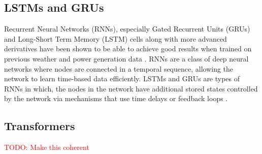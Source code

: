 \subsection{LSTMs and GRUs\label{cha:RNN}}
Recurrent Neural Networks (RNNs), especially Gated Recurrent Units (GRUs) and Long-Short Term Memory (LSTM) cells \cite{Goodfellow-et-al-2016} along with more advanced derivatives have been shown to be able to achieve good results when trained on previous weather and power generation data \cite{lin_temporal_2020, lee_forecasting_2018, jaidee_very_2019, su_machine_2019}.
RNNs are a class of deep neural networks where nodes are connected in a temporal sequence, allowing the network to learn time-based data efficiently. LSTMs and GRUs are types of RNNs in which, the nodes in the network have additional stored states controlled by the network via mechanisms that use time delays or feedback loops \cite{Goodfellow-et-al-2016, noauthor_recurrent_2021}.\\




\subsection{Transformers\label{cha:transformer}}
 \textcolor{red}{TODO: Make this coherent}
 
